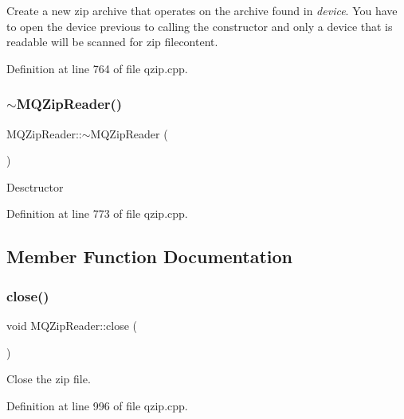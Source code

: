 Create a new zip archive that operates on the archive found in {\itshape device}. You have to open the device previous to calling the constructor and only a device that is readable will be scanned for zip filecontent. 

Definition at line 764 of file qzip.\+cpp.

\mbox{\label{class_m_q_zip_reader_ac669746daffc30103dab493e990ca141}} 
\subsubsection{\texorpdfstring{$\sim$\+M\+Q\+Zip\+Reader()}{~MQZipReader()}}
{\footnotesize\ttfamily M\+Q\+Zip\+Reader\+::$\sim$\+M\+Q\+Zip\+Reader (\begin{DoxyParamCaption}{ }\end{DoxyParamCaption})}

Desctructor 

Definition at line 773 of file qzip.\+cpp.



\subsection{Member Function Documentation}
\mbox{\label{class_m_q_zip_reader_a4f83f0feb67643ef0f119669184a4edd}} 
\subsubsection{\texorpdfstring{close()}{close()}}
{\footnotesize\ttfamily void M\+Q\+Zip\+Reader\+::close (\begin{DoxyParamCaption}{ }\end{DoxyParamCaption})}

Close the zip file. 

Definition at line 996 of file qzip.\+cpp.

\mbox{\label{class_m_q_zip_reader_a31a932689f554f36f097b96387788e94}} 
